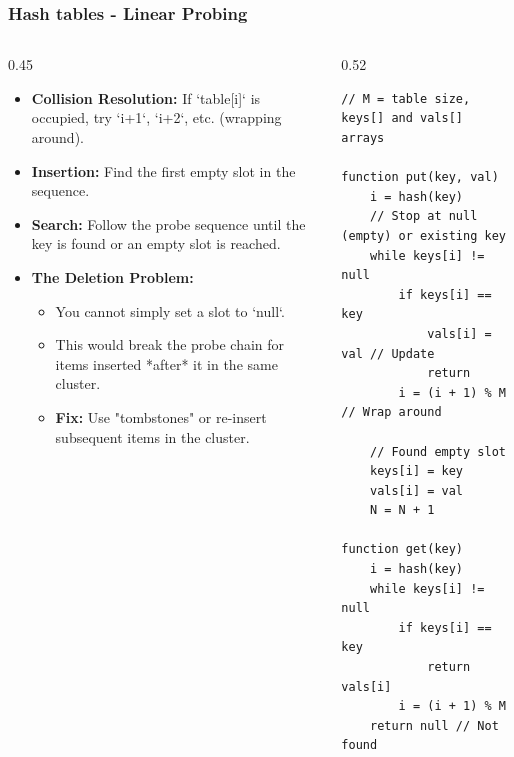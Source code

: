 \documentclass[8pt,aspectratio=169]{beamer}
\begin{document}
\begin{frame}[fragile]
\frametitle{Hash tables - Linear Probing}

\begin{columns}[T]
    \begin{column}{0.45\textwidth}
        \begin{itemize}
            \item \textbf{Collision Resolution:} If `table[i]` is occupied, try `i+1`, `i+2`, etc. (wrapping around).
            \item \textbf{Insertion:} Find the first empty slot in the sequence.
            \item \textbf{Search:} Follow the probe sequence until the key is found or an empty slot is reached.
            \item \textbf{The Deletion Problem:}
            \begin{itemize}
                \item You cannot simply set a slot to `null`.
                \item This would break the probe chain for items inserted *after* it in the same cluster.
                \item \textbf{Fix:} Use "tombstones" or re-insert subsequent items in the cluster.
            \end{itemize}
        \end{itemize}
    \end{column}

    \begin{column}{0.52\textwidth}
    \begin{lstlisting}[basicstyle=\tiny\ttfamily, frame=single]
// M = table size, keys[] and vals[] arrays

function put(key, val)
    i = hash(key)
    // Stop at null (empty) or existing key
    while keys[i] != null
        if keys[i] == key
            vals[i] = val // Update
            return
        i = (i + 1) % M // Wrap around
    
    // Found empty slot
    keys[i] = key
    vals[i] = val
    N = N + 1

function get(key)
    i = hash(key)
    while keys[i] != null
        if keys[i] == key
            return vals[i]
        i = (i + 1) % M
    return null // Not found
    \end{lstlisting}
    \end{column}
\end{columns}

\end{frame}
\end{document}
